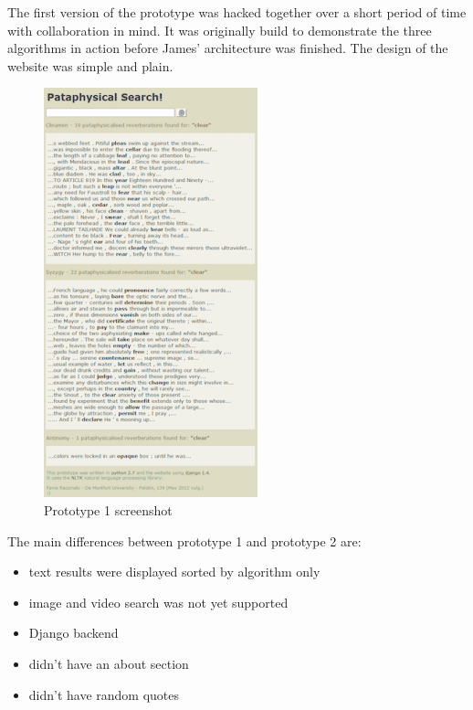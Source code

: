 
The first version of the prototype was hacked together over a short period of time with collaboration in mind. It was originally build to demonstrate the three algorithms in action before James' architecture was finished. The design of the website was simple and plain.

\begin{figure}[htbp] %
  \centering
  \includegraphics[height=0.6\textheight]{images/prototype01}
\caption[Prototype 1 screenshot]{Prototype 1 screenshot}
\label{img:Prototype1x}
\end{figure}

The main differences between prototype 1 and prototype 2 are:
\begin{itemize}
  \item text results were displayed sorted by algorithm only
  \item image and video search was not yet supported
  \item Django backend
  \item didn't have an about section
  \item didn't have random quotes
\end{itemize}

\stopcontents[chapters]
